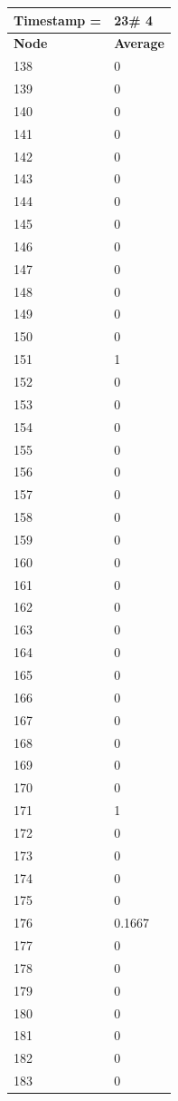 \begin{tabular}{|l||l|}
\hline
\textbf{Timestamp =} & \textbf{23}\# 4\\\hline
	\textbf{Node} & \textbf{Average} \\ \hline
\hline
	138 & 0 \\ \hline
	139 & 0 \\ \hline
	140 & 0 \\ \hline
	141 & 0 \\ \hline
	142 & 0 \\ \hline
	143 & 0 \\ \hline
	144 & 0 \\ \hline
	145 & 0 \\ \hline
	146 & 0 \\ \hline
	147 & 0 \\ \hline
	148 & 0 \\ \hline
	149 & 0 \\ \hline
	150 & 0 \\ \hline
	151 & 1 \\ \hline
	152 & 0 \\ \hline
	153 & 0 \\ \hline
	154 & 0 \\ \hline
	155 & 0 \\ \hline
	156 & 0 \\ \hline
	157 & 0 \\ \hline
	158 & 0 \\ \hline
	159 & 0 \\ \hline
	160 & 0 \\ \hline
	161 & 0 \\ \hline
	162 & 0 \\ \hline
	163 & 0 \\ \hline
	164 & 0 \\ \hline
	165 & 0 \\ \hline
	166 & 0 \\ \hline
	167 & 0 \\ \hline
	168 & 0 \\ \hline
	169 & 0 \\ \hline
	170 & 0 \\ \hline
	171 & 1 \\ \hline
	172 & 0 \\ \hline
	173 & 0 \\ \hline
	174 & 0 \\ \hline
	175 & 0 \\ \hline
	176 & 0.1667 \\ \hline
	177 & 0 \\ \hline
	178 & 0 \\ \hline
	179 & 0 \\ \hline
	180 & 0 \\ \hline
	181 & 0 \\ \hline
	182 & 0 \\ \hline
	183 & 0 \\ \hline
\end{tabular}
